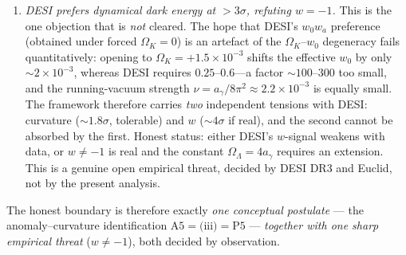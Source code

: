 \documentclass[11pt,a4paper]{article}
\theoremstyle{plain}
\theoremstyle{definition}
\theoremstyle{remark}
\newcommand{\Ok}{\Omega_K}
\newcommand{\OL}{\Omega_\Lambda}
\newcommand{\ag}{a_\gamma}
\begin{document}
\begin{enumerate}[leftmargin=*,nosep]
being determined (its inclusion is circular), and on $D^4$ only $\chi$ survives ($\sigma=0$). The
photon is the unique massless conformal non-gravitational field.
\item \emph{DESI prefers dynamical dark energy at $>3\sigma$, refuting $w=-1$.} This is the one
objection that is \emph{not} cleared. The hope that DESI's $w_0w_a$ preference (obtained under
forced $\Ok=0$) is an artefact of the $\Ok$--$w_0$ degeneracy fails quantitatively: opening to
$\Ok=+1.5\times10^{-3}$ shifts the effective $w_0$ by only ${\sim}2\times10^{-3}$, whereas DESI
requires $0.25$--$0.6$---a factor ${\sim}100$--$300$ too small, and the running-vacuum strength
$\nu=\ag/8\pi^2\approx 2.2\times10^{-3}$ is equally small. The framework therefore carries
\emph{two} independent tensions with DESI: curvature (${\sim}1.8\sigma$, tolerable) and $w$
(${\sim}4\sigma$ if real), and the second cannot be absorbed by the first. Honest status: either
DESI's $w$-signal weakens with data, or $w\neq-1$ is real and the constant $\OL=4\ag$ requires an
extension. This is a genuine open empirical threat, decided by DESI DR3 and Euclid, not by the
present analysis.
\end{enumerate}
The honest boundary is therefore exactly \emph{one conceptual postulate} --- the anomaly--curvature identification $\mathrm{A5}=\text{(iii)}=\mathrm{P5}$ --- \emph{together with one sharp empirical threat} ($w\neq-1$), both decided by observation.
\end{document}
